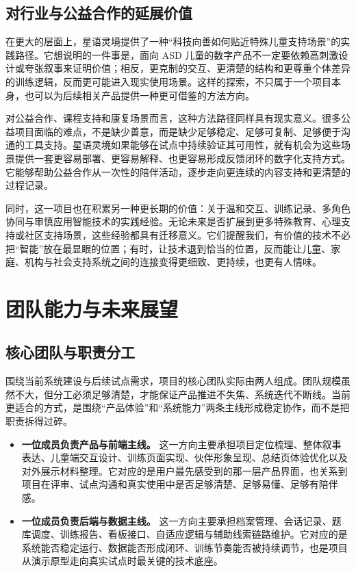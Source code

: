 \section{对行业与公益合作的延展价值}
在更大的层面上，星语灵境提供了一种“科技向善如何贴近特殊儿童支持场景”的实践路径。它想说明的一件事是，面向 ASD 儿童的数字产品不一定要依赖高刺激设计或夸张叙事来证明价值；相反，更克制的交互、更清楚的结构和更尊重个体差异的训练逻辑，反而更可能进入现实使用场景。这样的探索，不只属于一个项目本身，也可以为后续相关产品提供一种更可借鉴的方法方向。

对公益合作、课程支持和康复场景而言，这种方法路径同样具有现实意义。很多公益项目面临的难点，不是缺少善意，而是缺少足够稳定、足够可复制、足够便于沟通的工具支持。星语灵境如果能够在试点中持续验证其可用性，就有机会为这些场景提供一套更容易部署、更容易解释、也更容易形成反馈闭环的数字化支持方式。它能够帮助公益合作从一次性的陪伴活动，逐步走向更连续的内容支持和更清楚的过程记录。

同时，这一项目也在积累另一种更长期的价值：关于温和交互、训练记录、多角色协同与审慎应用智能技术的实践经验。无论未来是否扩展到更多特殊教育、心理支持或社区支持场景，这些经验都具有迁移意义。它们提醒我们，有价值的技术不必把“智能”放在最显眼的位置；有时，让技术退到恰当的位置，反而能让儿童、家庭、机构与社会支持系统之间的连接变得更细致、更持续，也更有人情味。

\chapter{团队能力与未来展望}

\section{核心团队与职责分工}
围绕当前系统建设与后续试点需求，项目的核心团队实际由两人组成。团队规模虽然不大，但分工必须足够清楚，才能保证产品推进不失焦、系统迭代不断线。当前更适合的方式，是围绕“产品体验”和“系统能力”两条主线形成稳定协作，而不是把职责拆得过碎。

\begin{itemize}
  \item \textbf{一位成员负责产品与前端主线。} 这一方向主要承担项目定位梳理、整体叙事表达、儿童端交互设计、训练页面实现、伙伴形象呈现、总结页体验优化以及对外展示材料整理。它对应的是用户最先感受到的那一层产品界面，也关系到项目在评审、试点沟通和真实使用中是否足够清楚、足够易懂、足够有陪伴感。
  \item \textbf{一位成员负责后端与数据主线。} 这一方向主要承担档案管理、会话记录、题库调度、训练报告、看板接口、自适应逻辑与辅助线索链路维护。它对应的是系统能否稳定运行、数据能否形成闭环、训练节奏能否被持续调节，也是项目从演示原型走向真实试点时最关键的技术底座。
\end{itemize}

